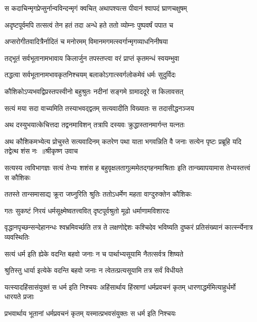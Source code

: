 \twolineshloka
{स कदाचिन्मृगप्रेप्सुर्नान्वविन्दन्मृगं क्वचित्}
{अथापश्यत्स पीवानं श्वापदं घ्राणचक्षुषम्}


\twolineshloka
{अदृष्टपूर्वमपि तत्सत्वं तेन हतं तदा}
{अन्धे हते ततो व्योम्नः पुष्पवर्षं पपात च}


\twolineshloka
{अप्सरोगीतवादित्रैर्नादितं च मनोरमम्}
{विमानमगमत्स्वर्गान्मृगव्याधनिनीषया}


\twolineshloka
{तद्भूतं सर्वभूतानामभावाय किलार्जुन}
{तपस्तप्त्वा वरं प्राप्तं कृतमन्धं स्वयम्भुवा}


\twolineshloka
{तद्धत्वा सर्वभूतानामभावकृतनिश्चयम्}
{बलाकोऽगात्स्वर्गलोकमेवं धर्मः सुदुर्विदः}


\twolineshloka
{कौशिकोऽप्यभवद्विप्रस्तपस्वीनो बहुश्रुतः}
{नदीनां सङ्गमे ग्रामाददूरे स किलावसत्}


\twolineshloka
{सत्यं मया सदा वाच्यमिति तस्याभवद्द्वतम्}
{सत्यवादीति विख्यातः स तदासीद्धनञ्जय}


\twolineshloka
{अथ दस्युभयात्केचित्तदा तद्वनमाविशन्}
{तत्रापि दस्यवः क्रुद्धास्तानमार्गन्त यत्नतः}


\fourlineindentedshloka
{अथ कौशिकमभ्येत्य प्रोचुस्ते सत्यवादिनम्}
{कतरेण पथा याता भगवन्निति वै जनाः}
{सत्येन पृष्टः प्रब्रूहि यदि तद्वेत्थ शंस नः ॥श्रीकृष्ण उवाच}
{}


\threelineshloka
{सत्यस्य त्वविभागज्ञः सत्यं तेभ्यः शशंस ह}
{बहुवृक्षलतागुल्ममेतद्गहनमाश्रिताः}
{इति तान्ख्यापयामास तेभ्यस्तत्त्वं स कौशिकः}


\twolineshloka
{ततस्ते तान्समासाद्य क्रूरा जघ्नुरिति श्रुतिः}
{ततोऽधर्मेण महता वाग्दुरुक्तेन कौशिकः}


\twolineshloka
{गतः सुकष्टं निरयं धर्मसूक्ष्मेष्वतत्त्ववित्}
{दृष्टपूर्वश्रुतो मूढो धर्माणामविशारदः}


वृद्धानपृच्छन्सन्देहानन्धः श्वभ्रमिवर्च्छति
\twolineshloka
{तत्र ते लक्षणोद्देशः कश्चिदेव भविष्यति}
{दुष्करं प्रतिसंख्यानं कार्त्स्न्येनात्र व्यवस्थितिः}


\twolineshloka
{सत्यं धर्म इति ह्येके वदन्ति बहवो जनाः}
{न च पार्थाभ्यसूयामि नैतत्सर्वत्र शिष्यते}


\twolineshloka
{श्रुतिस्तु धार्या इत्येके वदन्ति बहवो जनाः}
{न त्वेतत्प्रत्यसूयामि तत्र सर्वं विधीयते}


\threelineshloka
{यत्स्यादहिंसासंयुक्तं स धर्म इति निश्चयः}
{अहिंसार्थाय हिंस्राणां धर्मप्रवचनं कृतम्}
{धारणाद्धर्ममित्याहुर्धर्मो धारयते प्रजाः}


\twolineshloka
{प्रभवार्थाय भूतानां धर्मप्रवचनं कृतम्}
{यस्मात्प्रभवसंयुक्तः स धर्म इति निश्चयः}


